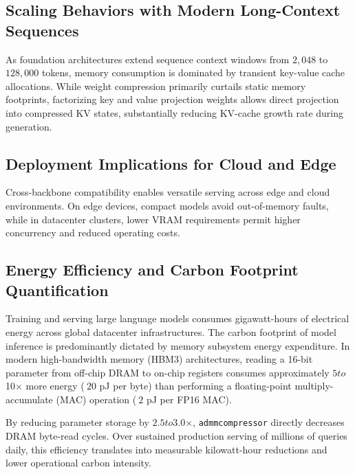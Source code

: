 \subsection{Scaling Behaviors with Modern Long-Context Sequences}
As foundation architectures extend sequence context windows from $2{,}048$ to $128{,}000$ tokens, memory consumption is dominated by transient key-value cache allocations. While weight compression primarily curtails static memory footprints, factorizing key and value projection weights allows direct projection into compressed KV states, substantially reducing KV-cache growth rate during generation.

\subsection{Deployment Implications for Cloud and Edge}
Cross-backbone compatibility enables versatile serving across edge and cloud environments. On edge devices, compact models avoid out-of-memory faults, while in datacenter clusters, lower VRAM requirements permit higher concurrency and reduced operating costs.

\subsection{Energy Efficiency and Carbon Footprint Quantification}
Training and serving large language models consumes gigawatt-hours of electrical energy across global datacenter infrastructures. The carbon footprint of model inference is predominantly dictated by memory subsystem energy expenditure. In modern high-bandwidth memory (HBM3) architectures, reading a 16-bit parameter from off-chip DRAM to on-chip registers consumes approximately $5$\times$ to $10$\times$ more energy ($~20$ pJ per byte) than performing a floating-point multiply-accumulate (MAC) operation ($~2$ pJ per FP16 MAC).

By reducing parameter storage by $2.5$\times$ to $3.0$\times$, \texttt{admmcompressor} directly decreases DRAM byte-read cycles. Over sustained production serving of millions of queries daily, this efficiency translates into measurable kilowatt-hour reductions and lower operational carbon intensity.
